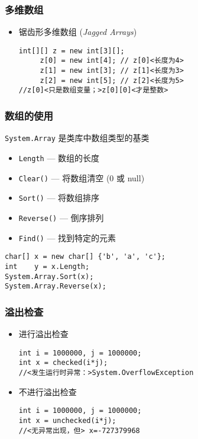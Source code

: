 \begin{frame}[fragile]
\frametitle{多维数组}
\begin{itemize}
\item 锯齿形多维数组 (\textit{Jagged Arrays})
\begin{lstlisting}[escapeinside=<>]
int[][] z = new int[3][];
     z[0] = new int[4]; // z[0]<长度为4>
     z[1] = new int[3]; // z[1]<长度为3>
     z[2] = new int[5]; // z[2]<长度为5>
//z[0]<只是数组变量；>z[0][0]<才是整数>

\end{lstlisting}
\end{itemize} \pause

  \begin{figure}[h] \label<1| handout:1>{fig:cs-array-rec}
    \centering 
  \end{figure}
\end{frame}

\begin{frame}[fragile]
\frametitle{数组的使用}
\texttt{System.Array} 是类库中数组类型的基类

\begin{itemize}
\item \texttt{Length} --- 数组的长度
\item \texttt{Clear()} --- 将数组清空 (0 或 null)
\item \texttt{Sort()} --- 将数组排序
\item \texttt{Reverse()} --- 倒序排列
\item \texttt{Find()} --- 找到特定的元素
\end{itemize}
\begin{lstlisting}
char[] x = new char[] {'b', 'a', 'c'};
int    y = x.Length;
System.Array.Sort(x);
System.Array.Reverse(x);
\end{lstlisting}

\end{frame}

\begin{frame}[fragile]
\frametitle{溢出检查}
\begin{itemize}
\item 进行溢出检查
\begin{lstlisting}[escapeinside=<>]
int i = 1000000, j = 1000000;
int x = checked(i*j);
//<发生运行时异常：>System.OverflowException

\end{lstlisting}

\item 不进行溢出检查
\begin{lstlisting}[escapeinside=<>]
int i = 1000000, j = 1000000;
int x = unchecked(i*j);
//<无异常出现，但> x=-727379968

\end{lstlisting}
\end{itemize}
\end{frame}


